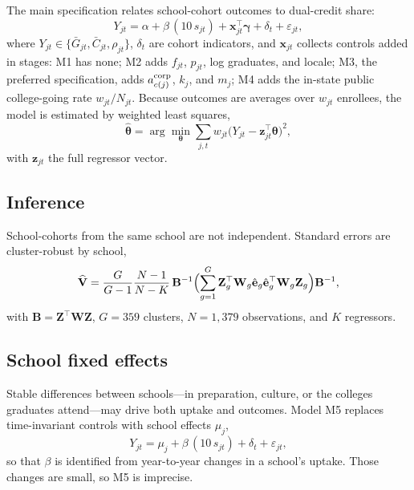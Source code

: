 \documentclass[aps,prd,reprint,superscriptaddress,nofootinbib,floatfix]{revtex4-2}
\begin{document}
The main specification relates school-cohort outcomes to dual-credit share:
\begin{equation}
Y_{jt}=\alpha+\beta\,(10\,s_{jt})+\mathbf{x}_{jt}^{\top}\boldsymbol{\gamma}+\delta_t+\varepsilon_{jt},\label{eq:main}
\end{equation}
where $Y_{jt}\in\{\bar G_{jt},\bar C_{jt},\rho_{jt}\}$, $\delta_t$ are cohort indicators, and $\mathbf{x}_{jt}$ collects controls added in stages: M1 has none; M2 adds $f_{jt}$, $p_{jt}$, log graduates, and locale; M3, the preferred specification, adds $a^{\rm corp}_{c(j)}$, $k_j$, and $m_j$; M4 adds the in-state public college-going rate $w_{jt}/N_{jt}$. Because outcomes are averages over $w_{jt}$ enrollees, the model is estimated by weighted least squares,
\begin{equation}
\hat{\boldsymbol\theta}=\arg\min_{\boldsymbol\theta}\sum_{j,t}w_{jt}\bigl(Y_{jt}-\mathbf{z}_{jt}^{\top}\boldsymbol\theta\bigr)^2,\label{eq:wls}
\end{equation}
with $\mathbf{z}_{jt}$ the full regressor vector.

\subsection{Inference}

School-cohorts from the same school are not independent. Standard errors are cluster-robust by school,
\begin{equation}
\widehat{\mathbf V}=\frac{G}{G-1}\frac{N-1}{N-K}\,\mathbf B^{-1}\Bigl(\sum_{g=1}^{G}\mathbf Z_g^{\top}\mathbf W_g\hat{\mathbf e}_g\hat{\mathbf e}_g^{\top}\mathbf W_g\mathbf Z_g\Bigr)\mathbf B^{-1},\label{eq:cluster}
\end{equation}
with $\mathbf B=\mathbf Z^{\top}\mathbf W\mathbf Z$, $G=359$ clusters, $N=1,379$ observations, and $K$ regressors.

\subsection{School fixed effects}

Stable differences between schools---in preparation, culture, or the colleges graduates attend---may drive both uptake and outcomes. Model M5 replaces time-invariant controls with school effects $\mu_j$,
\begin{equation}
Y_{jt}=\mu_j+\beta\,(10\,s_{jt})+\delta_t+\varepsilon_{jt},\label{eq:fe}
\end{equation}
so that $\beta$ is identified from year-to-year changes in a school's uptake. Those changes are small, so M5 is imprecise.
\end{document}
